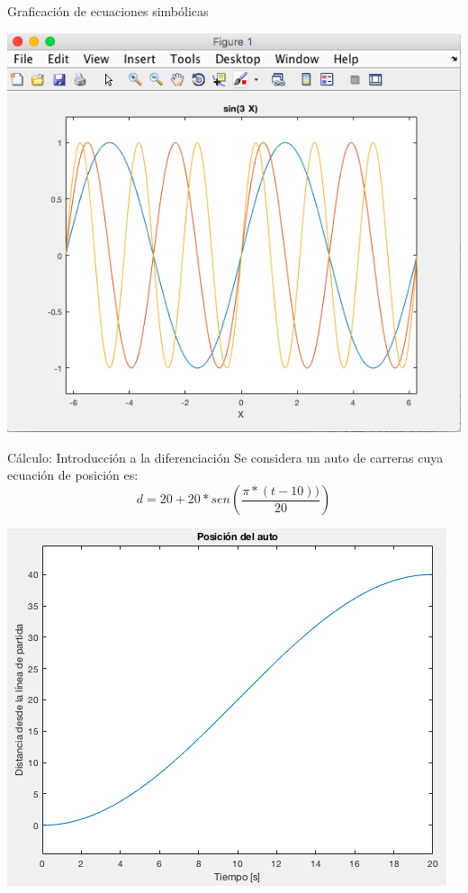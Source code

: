 \documentclass{bredelebeamer}
\begin{document}
\begin{frame}{Graficación de ecuaciones simbólicas}
\begin{center}
\includegraphics[scale=0.3]{images/fig5.png}
\end{center}
\end{frame}

\begin{frame}{Cálculo: Introducción a la diferenciación}
Se considera un auto de carreras cuya ecuación de posición es:
\begin{equation*}
d=20+20*sen(\frac{\pi *(t-10))}{20})
\end{equation*}
\begin{center}
\includegraphics[scale=0.3]{images/fig6.png}
\end{center}
\end{frame}
\end{document}
